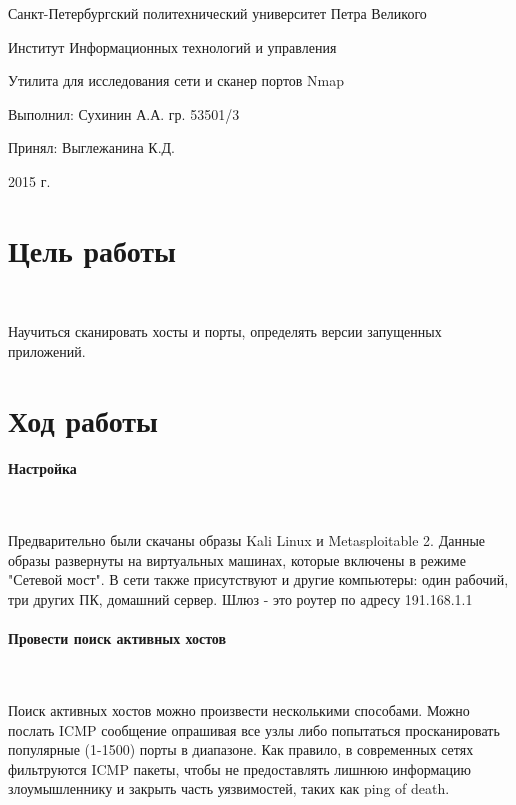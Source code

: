 \documentclass{article}
\begin{document}
\begin{titlepage} \begin{center}

	\Large			
Санкт-Петербургский политехнический университет Петра Великого
			
	\vspace{0.2cm}	
Институт Информационных технологий и управления
		
	\vspace{2cm} \vfill \huge
Утилита для исследования сети и сканер портов Nmap
		
	\vfill 
	\begin{flushleft} \large \hangindent=8cm 
Выполнил: Сухинин А.А. гр. 53501/3 \hrulefill
			
Принял: Выглежанина К.Д. \hrulefill
	\end{flushleft}
		
	\vspace{2cm} \vfill \LARGE
2015 г.
		
\end{center} \end{titlepage}


\section{Цель работы}
~

Научиться сканировать хосты и порты, определять версии запущенных приложений.

\section{Ход работы}

\paragraph{Настройка}
~

Предварительно были скачаны образы Kali Linux и Metasploitable 2. Данные образы развернуты на виртуальных машинах, которые включены в режиме "Сетевой мост". В сети также присутствуют и другие компьютеры: один рабочий, три других ПК, домашний сервер. Шлюз - это роутер по адресу 191.168.1.1

\paragraph{Провести поиск активных хостов}
~

Поиск активных хостов можно произвести несколькими способами. Можно послать ICMP сообщение опрашивая все узлы либо попытаться просканировать популярные (1-1500) порты в диапазоне. Как правило, в современных сетях фильтруются ICMP пакеты, чтобы не предоставлять лишнюю информацию злоумышленнику и закрыть часть уязвимостей, таких как ping of death.
\end{document}
